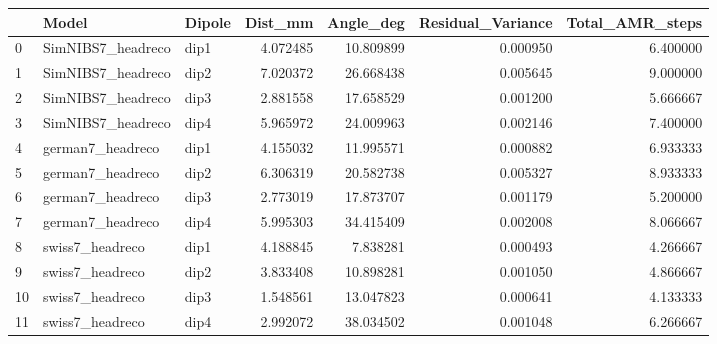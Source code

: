 \begin{tabular}{lllrrrr}
\toprule
{} &              Model & Dipole &   Dist\_mm &  Angle\_deg &  Residual\_Variance &  Total\_AMR\_steps \\
\midrule
0  &  SimNIBS7\_headreco &   dip1 &  4.072485 &  10.809899 &           0.000950 &         6.400000 \\
1  &  SimNIBS7\_headreco &   dip2 &  7.020372 &  26.668438 &           0.005645 &         9.000000 \\
2  &  SimNIBS7\_headreco &   dip3 &  2.881558 &  17.658529 &           0.001200 &         5.666667 \\
3  &  SimNIBS7\_headreco &   dip4 &  5.965972 &  24.009963 &           0.002146 &         7.400000 \\
4  &   german7\_headreco &   dip1 &  4.155032 &  11.995571 &           0.000882 &         6.933333 \\
5  &   german7\_headreco &   dip2 &  6.306319 &  20.582738 &           0.005327 &         8.933333 \\
6  &   german7\_headreco &   dip3 &  2.773019 &  17.873707 &           0.001179 &         5.200000 \\
7  &   german7\_headreco &   dip4 &  5.995303 &  34.415409 &           0.002008 &         8.066667 \\
8  &    swiss7\_headreco &   dip1 &  4.188845 &   7.838281 &           0.000493 &         4.266667 \\
9  &    swiss7\_headreco &   dip2 &  3.833408 &  10.898281 &           0.001050 &         4.866667 \\
10 &    swiss7\_headreco &   dip3 &  1.548561 &  13.047823 &           0.000641 &         4.133333 \\
11 &    swiss7\_headreco &   dip4 &  2.992072 &  38.034502 &           0.001048 &         6.266667 \\
\bottomrule
\end{tabular}


